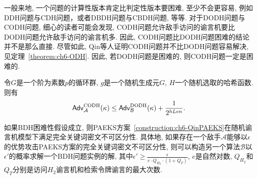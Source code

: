 \begin{note}
一般来地, 一个问题的计算性版本肯定比判定性版本要困难, 至少不会更容易, 例如DDH问题与CDH问题，或者DBDH问题与CBDH问题, 等等. 对于DODH问题与CODH问题, 细心的读者可能会发现, CODH问题允许敌手访问的谕言机要比DODH问题允许敌手访问的谕言机多. 因此, CODH问题比DODH问题困难的结论并不是那么直接. 尽管如此, Qin等人证明CODH问题并不比DODH问题容易解决, 见定理~\ref{theorem:ch6-ODH}. 因此, 若DODH问题是困难的, 则CODH问题一定是困难的.
\end{note}

\begin{theorem}\label{theorem:ch6-ODH}
令$G$是一个阶为素数$p$的循环群, $g$是一个随机生成元$G$, $H$一个随机选取的哈希函数. 则有
\[
\mathsf{Adv}_{\mathcal{A}}^{\textup{CODH}}(\kappa) \leq \mathsf{Adv}_{\mathcal{B}}^{\textup{DODH}}(\kappa) + \frac{1}{2^{hLen}}.
\]
\end{theorem}


\begin{theorem}\label{theorem:ch6-PAEKS-CI}
如果BDH困难性假设成立, 则PAEKS方案~\ref{construction:ch6-QinPAEKS}在随机谕言机模型下满足完全关键词密文不可区分性. 具体地, 如果存在一个敌手$\mathcal{A}$能够以$\epsilon$的优势攻击PAEKS方案的完全关键词密文不可区分性, 则可以构造另一个算法$\mathcal{B}$以$\epsilon'$的概率求解一个BDH问题实例的解, 其中$\epsilon'\geq \frac{\epsilon}{e\cdot Q_{H_2}\cdot (1+Q_T)}$, $e$是自然对数, $Q_{H_2}$和$Q_T$分别是访问$H_2$谕言机和检索令牌谕言的最大次数.
\end{theorem}

